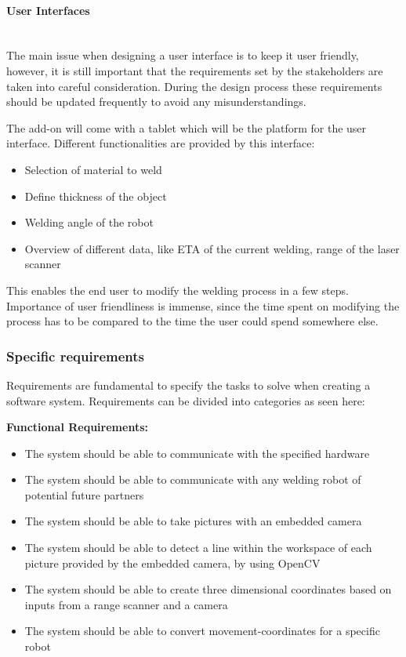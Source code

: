\paragraph*{User Interfaces}~\\
The main issue when designing a user interface is to keep it user friendly, however, it is still important that the requirements set by the stakeholders are taken into careful consideration. During the design process these requirements should be updated frequently to avoid any misunderstandings.

The add-on will come with a tablet which will be the platform for the user interface. Different functionalities are provided by this interface: 

\begin{itemize}

\item Selection of material to weld 
\item Define thickness of the object
\item Welding angle of the robot
\item Overview of different data, like ETA of the current welding, range of the laser scanner

\end{itemize}

This enables the end user to modify the welding process in a few steps. Importance of user friendliness is immense, since the time spent on modifying the process has to be compared to the time the user could spend somewhere else.

\subsubsection{Specific requirements}
Requirements are fundamental to specify the tasks to solve when creating a software system. Requirements can be divided into categories as seen here:

\textbf{Functional Requirements:}
\begin{itemize}

\item The system should be able to communicate with the specified hardware
\item The system should be able to communicate with any welding robot of potential future partners
\item The system should be able to take pictures with an embedded camera 
\item The system should be able to detect a line within the workspace of each picture provided by the embedded camera, by using OpenCV
\item The system should be able to create three dimensional coordinates based on inputs from a range scanner and a camera
\item The system should be able to convert movement-coordinates for a specific robot

\end{itemize}

